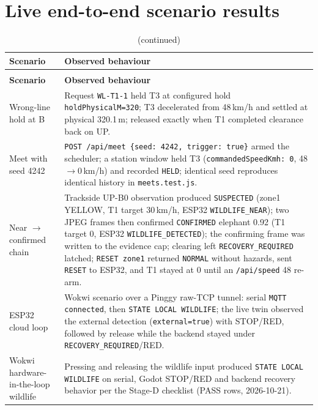 \section{Live end-to-end scenario results}

\begin{longtable}{>{\raggedright}p{4.6cm} >{\raggedright\arraybackslash}p{10.4cm}}
\caption{Live recorded runs on the working stack}\label{tab:livescenarios}\\
\toprule
\textbf{Scenario} & \textbf{Observed behaviour} \\
\midrule
\endfirsthead
\caption[]{(continued)}\\
\toprule
\textbf{Scenario} & \textbf{Observed behaviour} \\
\midrule
\endhead
Wrong-line hold at B & Request \texttt{WL-T1-1} held T3 at configured hold
\texttt{holdPhysicalM=320}; T3 decelerated from 48\,km/h and settled at
physical 320.1\,m; released exactly when T1 completed clearance back on UP. \\
Meet with seed 4242 & \texttt{POST /api/meet \{seed: 4242, trigger: true\}}
armed the scheduler; a station window held T3 (\texttt{commandedSpeedKmh:
0}, 48$\rightarrow$0\,km/h) and recorded \texttt{HELD}; identical seed
reproduces identical history in \texttt{meets.test.js}. \\
Near $\rightarrow$ confirmed chain & Trackside UP-B0 observation produced
\texttt{SUSPECTED} (zone1 YELLOW, T1 target 30\,km/h, ESP32
\texttt{WILDLIFE\_NEAR}); two JPEG frames then confirmed
\texttt{CONFIRMED} elephant 0.92 (T1 target 0, ESP32
\texttt{WILDLIFE\_DETECTED}); the confirming frame was written to the
evidence cap; clearing left \texttt{RECOVERY\_REQUIRED} latched;
\texttt{RESET zone1} returned \texttt{NORMAL} without hazards, sent
\texttt{RESET} to ESP32, and T1 stayed at 0 until an
\texttt{/api/speed} 48 re-arm. \\
ESP32 cloud loop & Wokwi scenario over a Pinggy raw-TCP tunnel: serial
\texttt{MQTT connected}, then \texttt{STATE LOCAL WILDLIFE}; the live
twin observed the external detection (\texttt{external=true}) with
STOP/RED, followed by release while the backend stayed under
\texttt{RECOVERY\_REQUIRED}/RED. \\
Wokwi hardware-in-the-loop wildlife & Pressing and releasing the wildlife
input produced \texttt{STATE LOCAL WILDLIFE} on serial, Godot STOP/RED and
backend recovery behavior per the Stage-D checklist (PASS rows,
2026-10-21). \\
\bottomrule
\end{longtable}

